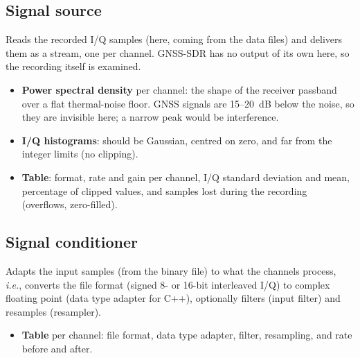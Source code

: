 \documentclass{article}
\begin{document}
\subsection{Signal source}
Reads the recorded I/Q samples (here, coming from the data files) and delivers them as a stream, one per channel. GNSS-SDR has no output of its own here, so the recording itself is examined.
\begin{itemize}
  \item \textbf{Power spectral density} per channel: the shape of the receiver passband over a flat thermal-noise floor. GNSS signals are 15--20~dB below the noise, so they are invisible here; a narrow peak would be interference.
  \item \textbf{I/Q histograms}: should be Gaussian, centred on zero, and far from the integer limits (no clipping).
  \item \textbf{Table}: format, rate and gain per channel, I/Q standard deviation and mean, percentage of clipped values, and samples lost during the recording (overflows, zero-filled).
\end{itemize}

\subsection{Signal conditioner}
Adapts the input samples (from the binary file) to what the channels process, \textit{i.e.}, converts the file format (signed 8- or 16-bit interleaved I/Q) to complex floating point (data type adapter for C++), optionally filters (input filter) and resamples (resampler).
\begin{itemize}
  \item \textbf{Table} per channel: file format, data type adapter, filter, resampling, and rate before and after.
\end{itemize}
\end{document}
